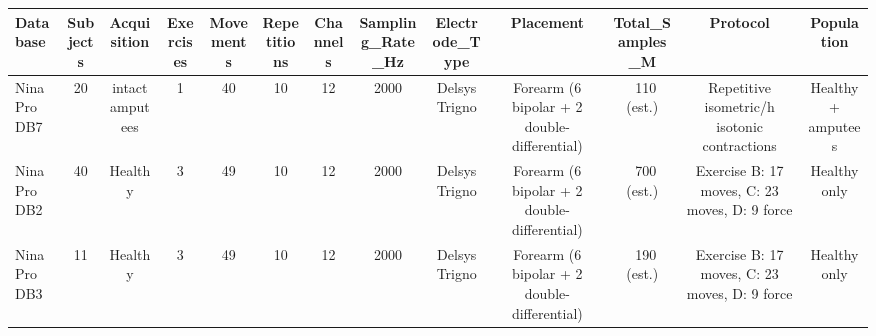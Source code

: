 \begin{tabular}{lcccccccccccc}
\toprule
Database & Subjects & Acquisition & Exercises & Movements & Repetitions & Channels & Sampling_Rate_Hz & Electrode_Type & Placement & Total_Samples_M & Protocol & Population \\
\midrule
NinaPro DB7 & 20 &  intact amputees & 1 & 40 & 10 & 12 & 2000 & Delsys Trigno & Forearm (6 bipolar + 2 double-differential) & ~110 (est.) & Repetitive isometric/h isotonic contractions & Healthy + amputees \\
NinaPro DB2 & 40 & Healthy & 3 & 49 & 10 & 12 & 2000 & Delsys Trigno & Forearm (6 bipolar + 2 double-differential) & ~700 (est.) & Exercise B: 17 moves, C: 23 moves, D: 9 force & Healthy only \\
NinaPro DB3 & 11 & Healthy & 3 & 49 & 10 & 12 & 2000 & Delsys Trigno & Forearm (6 bipolar + 2 double-differential) & ~190 (est.) & Exercise B: 17 moves, C: 23 moves, D: 9 force & Healthy only \\
\bottomrule
\end{tabular}
